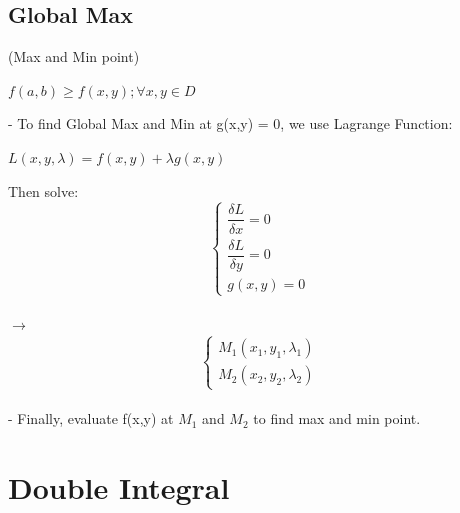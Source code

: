 \documentclass[12pt]{article}
\begin{document}
\subsection{Global Max} (Max and Min point)
\begin{mybox}
	\begin{center}
		$f(a,b) \ge f(x,y); \forall x,y \in D$
	\end{center}
\end{mybox}
- To find Global Max and Min at g(x,y) = 0, we use Lagrange Function: \\
\begin{mybox}
	\begin{center}
		$L(x,y, \lambda) = f(x,y) + \lambda g(x,y)$
	\end{center}
\end{mybox}
Then solve:
$$
\begin{cases}
	\dfrac{\delta L}{\delta x} = 0 \\ 
	\dfrac{\delta L}{\delta y} = 0 \\
	g(x,y) = 0
\end{cases}
$$
\\
$\rightarrow$ 
$$
\begin{cases}
	M_1 (x_1,y_1, \lambda _1) \\
	M_2 (x_2, y_2, \lambda _2)
\end{cases}
$$
\\ 
- Finally, evaluate f(x,y) at $M_1$ and $M_2$ to find max and min point.
\section{Double Integral}
\end{document}
